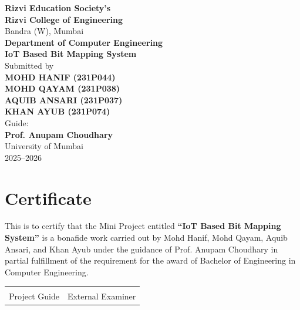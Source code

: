 \documentclass[12pt,a4paper,twoside]{report}
\begin{document}
	
	\begin{titlepage}
		\centering
		
		
		\textbf{\large Rizvi Education Society’s}\\
		{\LARGE \textbf{Rizvi College of Engineering}}\\
		{\large Bandra (W), Mumbai}\\[1cm]
		
		{\Large \textbf{Department of Computer Engineering}}\\[1.5cm]
		
		{\Huge \textbf{IoT Based Bit Mapping System}}\\[1cm]
		
		{\large Submitted by}\\[0.5cm]
		
		\textbf{MOHD HANIF (231P044)}\\
		\textbf{MOHD QAYAM (231P038)}\\
		\textbf{AQUIB ANSARI (231P037)}\\
		\textbf{KHAN AYUB (231P074)}\\[1cm]
		
		Guide:\\
		\textbf{Prof. Anupam Choudhary}\\[1cm]
		
		University of Mumbai\\
		2025--2026
		
	\end{titlepage}
	
	\chapter*{Certificate}
	
	This is to certify that the Mini Project entitled \textbf{“IoT Based Bit Mapping System”} is a bonafide work carried out by Mohd Hanif, Mohd Qayam, Aquib Ansari, and Khan Ayub under the guidance of Prof. Anupam Choudhary in partial fulfillment of the requirement for the award of Bachelor of Engineering in Computer Engineering.
	
	\vspace{2cm}
	
	\begin{tabular}{p{7cm} p{7cm}}
		\underline{\hspace{5cm}} & \underline{\hspace{5cm}} \\
		Project Guide & External Examiner \\
	\end{tabular}
	
\end{document}
